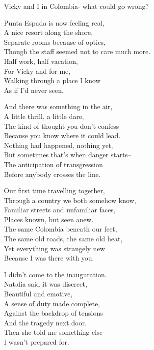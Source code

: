 \begin{lyrics}
Vicky and I in Colombia- what could go wrong?

Punta Espada is now feeling real,\\
A nice resort along the shore,\\
Separate rooms because of optics,\\
Though the staff seemed not to care much more.\\
Half work, half vacation,\\
For Vicky and for me,\\
Walking through a place I know\\
As if I'd never seen.

And there was something in the air,\\
A little thrill, a little dare,\\
The kind of thought you don't confess\\
Because you know where it could lead.\\
Nothing had happened, nothing yet,\\
But sometimes that's when danger starts--\\
The anticipation of transgression\\
Before anybody crosses the line.

Our first time travelling together,\\
Through a country we both somehow know,\\
Familiar streets and unfamiliar faces,\\
Places known, but seen anew.\\
The same Colombia beneath our feet,\\
The same old roads, the same old heat,\\
Yet everything was strangely new\\
Because I was there with you.

I didn't come to the inauguration.\\
Natalia said it was discreet,\\
Beautiful and emotive,\\
A sense of duty made complete,\\
Against the backdrop of tensions\\
And the tragedy next door.\\
Then she told me something else\\
I wasn't prepared for.


\end{lyrics}
